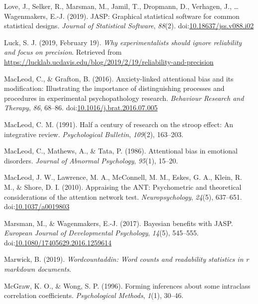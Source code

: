 \documentclass[english,,man,floatsintext]{apa6}
\begin{document}
\leavevmode\hypertarget{ref-love_jasp:_2019}{}%
Love, J., Selker, R., Marsman, M., Jamil, T., Dropmann, D., Verhagen, J., \ldots{} Wagenmakers, E.-J. (2019). JASP: Graphical statistical software for common statistical designs. \emph{Journal of Statistical Software}, \emph{88}(2). doi:\href{https://doi.org/10.18637/jss.v088.i02}{10.18637/jss.v088.i02}

\leavevmode\hypertarget{ref-luck_why_2019}{}%
Luck, S. J. (2019, February 19). \emph{Why experimentalists should ignore reliability and focus on precision}. Retrieved from \url{https://lucklab.ucdavis.edu/blog/2019/2/19/reliability-and-precision}

\leavevmode\hypertarget{ref-macleod_anxiety-linked_2016}{}%
MacLeod, C., \& Grafton, B. (2016). Anxiety-linked attentional bias and its modification: Illustrating the importance of distinguishing processes and procedures in experimental psychopathology research. \emph{Behaviour Research and Therapy}, \emph{86}, 68--86. doi:\href{https://doi.org/10.1016/j.brat.2016.07.005}{10.1016/j.brat.2016.07.005}

\leavevmode\hypertarget{ref-macleod_half_1991}{}%
MacLeod, C. M. (1991). Half a century of research on the stroop effect: An integrative review. \emph{Psychological Bulletin}, \emph{109}(2), 163--203.

\leavevmode\hypertarget{ref-macleod_attentional_1986}{}%
MacLeod, C., Mathews, A., \& Tata, P. (1986). Attentional bias in emotional disorders. \emph{Journal of Abnormal Psychology}, \emph{95}(1), 15--20.

\leavevmode\hypertarget{ref-macleod_appraising_2010}{}%
MacLeod, J. W., Lawrence, M. A., McConnell, M. M., Eskes, G. A., Klein, R. M., \& Shore, D. I. (2010). Appraising the ANT: Psychometric and theoretical considerations of the attention network test. \emph{Neuropsychology}, \emph{24}(5), 637--651. doi:\href{https://doi.org/10.1037/a0019803}{10.1037/a0019803}

\leavevmode\hypertarget{ref-marsman_bayesian_2017}{}%
Marsman, M., \& Wagenmakers, E.-J. (2017). Bayesian benefits with JASP. \emph{European Journal of Developmental Psychology}, \emph{14}(5), 545--555. doi:\href{https://doi.org/10.1080/17405629.2016.1259614}{10.1080/17405629.2016.1259614}

\leavevmode\hypertarget{ref-R-wordcountaddin}{}%
Marwick, B. (2019). \emph{Wordcountaddin: Word counts and readability statistics in r markdown documents}.

\leavevmode\hypertarget{ref-mcgraw_forming_1996}{}%
McGraw, K. O., \& Wong, S. P. (1996). Forming inferences about some intraclass correlation coefficients. \emph{Psychological Methods}, \emph{1}(1), 30--46.
\end{document}
